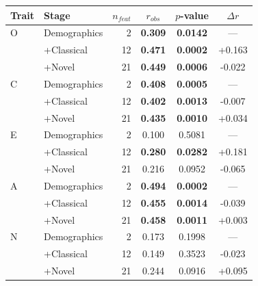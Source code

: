\begin{tabular}{llrccc}
\toprule
Trait & Stage & $n_{feat}$ & $r_{obs}$ & $p$-value & $\Delta r$ \\
\midrule
O & Demographics & 2 & \textbf{0.309} & \textbf{0.0142} & --- \\
 & +Classical & 12 & \textbf{0.471} & \textbf{0.0002} & +0.163 \\
 & +Novel & 21 & \textbf{0.449} & \textbf{0.0006} & -0.022 \\
\midrule
C & Demographics & 2 & \textbf{0.408} & \textbf{0.0005} & --- \\
 & +Classical & 12 & \textbf{0.402} & \textbf{0.0013} & -0.007 \\
 & +Novel & 21 & \textbf{0.435} & \textbf{0.0010} & +0.034 \\
\midrule
E & Demographics & 2 & 0.100 & 0.5081 & --- \\
 & +Classical & 12 & \textbf{0.280} & \textbf{0.0282} & +0.181 \\
 & +Novel & 21 & 0.216 & 0.0952 & -0.065 \\
\midrule
A & Demographics & 2 & \textbf{0.494} & \textbf{0.0002} & --- \\
 & +Classical & 12 & \textbf{0.455} & \textbf{0.0014} & -0.039 \\
 & +Novel & 21 & \textbf{0.458} & \textbf{0.0011} & +0.003 \\
\midrule
N & Demographics & 2 & 0.173 & 0.1998 & --- \\
 & +Classical & 12 & 0.149 & 0.3523 & -0.023 \\
 & +Novel & 21 & 0.244 & 0.0916 & +0.095 \\
\bottomrule
\end{tabular}
